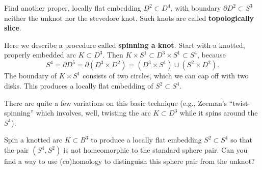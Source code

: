 \documentclass[12pt]{pset}
\begin{document}
\begin{problem}
  Find another proper, locally flat embedding $D^2 \subset D^4$, with
  boundary $\partial D^2 \subset S^3$ neither the unknot nor the
  stevedore knot.  Such knots are called \textbf{topologically slice}.
\end{problem}

\begin{definition*}
  Here we describe a procedure called \textbf{spinning a knot}.  Start
  with a knotted, properly embedded arc $K \subset D^3$.  Then $K
  \times S^1 \subset D^3 \times S^1 \subset S^4$, because
  $$S^4 = \partial D^5 = \partial(D^3 \times D^2) = (D^3
  \times S^1) \cup (S^2 \times D^2).$$
  The boundary of $K \times S^1$
  consists of two circles, which we can cap off with two disks.  This
  produces a locally flat embedding of $S^2 \subset S^4$.

  There are quite a few variations on this basic technique (e.g.,
  Zeeman's ``twist-spinning'' which involves, well, twisting the arc
  $K \subset D^3$ while it spins around the $S^1$).
\end{definition*}

\begin{requiredproblem}
  Spin a knotted arc $K \subset B^3$ to produce a locally flat
  embedding $S^2 \subset S^4$ so that the pair $(S^4,S^2)$ is not
  homeomorphic to the standard sphere pair.  Can you find a way to use
  (co)homology to distinguish this sphere pair from the unknot?
\end{requiredproblem}
\end{document}
